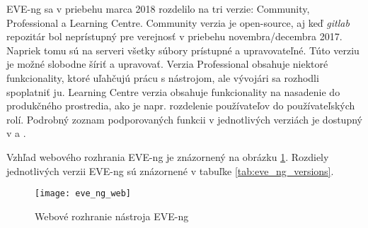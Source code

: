 EVE-ng sa v priebehu marca 2018 rozdelilo na tri verzie: Community, Professional a Learning Centre. Community verzia je open-source, aj keď \emph{gitlab} repozitár bol neprístupný pre verejnosť v priebehu novembra/decembra 2017. Napriek tomu sú na serveri všetky súbory prístupné a upravovateľné. Túto verziu je možné slobodne šíriť a upravovať. Verzia Professional obsahuje niektoré funkcionality, ktoré uľahčujú prácu s nástrojom, ale vývojári sa rozhodli spoplatniť ju. Learning Centre verzia obsahuje funkcionality na nasadenie do produkčného prostredia, ako je napr. rozdelenie používateľov do používateľských rolí. Podrobný zoznam podporovaných funkcii v jednotlivých verziách je dostupný v \cite{eve_ng_versions_table} a \cite{eve_ng_versions_list}.

Vzhľad webového rozhrania EVE-ng je znázornený na obrázku \ref{obr:eve_ng_web}. Rozdiely jednotlivých verzii EVE-ng sú znázornené v tabuľke \ref{tab:eve_ng_versions}.

\begin{figure}
    \centering
    \texttt{[image: eve\_ng\_web]}
    \caption{Webové rozhranie nástroja EVE-ng}
    \label{obr:eve_ng_web}
\end{figure}

